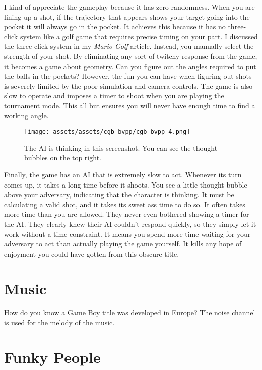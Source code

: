 \documentclass{book}
\begin{document}
I kind of appreciate the gameplay because it has zero randomness. When you are lining up a shot, if the trajectory that appears shows your target going into the pocket it will always go in the pocket. It achieves this because it has no three-click system like a golf game that requires precise timing on your part. I discussed the three-click system in my \emph{Mario Golf} article. Instead, you manually select the strength of your shot. By eliminating any sort of twitchy response from the game, it becomes a game about geometry. Can you figure out the angles required to put the balls in the pockets? However, the fun you can have when figuring out shots is severely limited by the poor simulation and camera controls. The game is also slow to operate and imposes a timer to shoot when you are playing the tournament mode. This all but ensures you will never have enough time to find a working angle.

\begin{figure}[hbt]
\vskip 10pt
\centering \texttt{[image: assets/assets/cgb-bvpp/cgb-bvpp-4.png]}\par\pagetwodescription The AI is thinking in this screenshot. You can see the thought bubbles on the top right.
\vskip 6pt
\end{figure}
Finally, the game has an AI that is extremely slow to act. Whenever its turn comes up, it takes a long time before it shoots. You see a little thought bubble above your adversary, indicating that the character is thinking. It must be calculating a valid shot, and it takes its sweet ass time to do so. It often takes more time than you are allowed. They never even bothered showing a timer for the AI. They clearly knew their AI couldn’t respond quickly, so they simply let it work without a time constraint. It means you spend more time waiting for your adversary to act than actually playing the game yourself. It kills any hope of enjoyment you could have gotten from this obscure title.

\FloatBarrier\needspace{10mm}\section*{Music}\nopagebreak[4]

How do you know a Game Boy title was developed in Europe? The noise channel is used for the melody of the music.

\FloatBarrier\needspace{10mm}\section*{Funky People}\nopagebreak[4]
\end{document}
